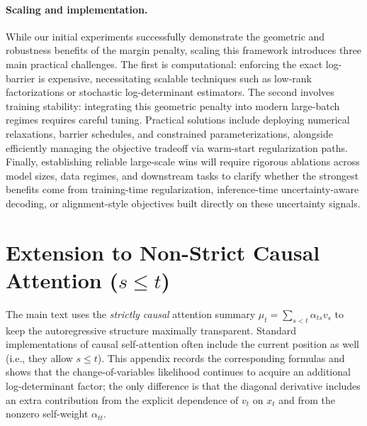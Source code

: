 \documentclass[11pt]{article}
\begin{document}
\paragraph{Scaling and implementation.}
While our initial experiments successfully demonstrate the geometric and robustness benefits of the margin penalty, scaling this framework introduces three main practical challenges.
The first is computational: enforcing the exact log-barrier is expensive, necessitating scalable techniques such as low-rank factorizations or stochastic log-determinant estimators.
The second involves training stability: integrating this geometric penalty into modern large-batch regimes requires careful tuning. Practical solutions include deploying numerical relaxations, barrier schedules, and constrained parameterizations, alongside efficiently managing the objective tradeoff via warm-start regularization paths.
Finally, establishing reliable large-scale wins will require rigorous ablations across model sizes, data regimes, and downstream tasks to clarify whether the strongest benefits come from training-time regularization, inference-time uncertainty-aware decoding, or alignment-style objectives built directly on these uncertainty signals.


\setlength{\bibsep}{2pt}
 


\appendix

\section{Extension to Non-Strict Causal Attention (\texorpdfstring{$s \le t$}{s <= t})}
\label{app:self_in_context}

The main text uses the \emph{strictly causal} attention summary $\mu_t=\sum_{s<t}\alpha_{ts}v_s$ to keep the autoregressive structure maximally transparent. Standard implementations of causal self-attention often include the current position as well (i.e., they allow $s\le t$). This appendix records the corresponding formulas and shows that the change-of-variables likelihood continues to acquire an additional log-determinant factor; the only difference is that the diagonal derivative includes an extra contribution from the explicit dependence of $v_t$ on $x_t$ and from the nonzero self-weight $\alpha_{tt}$.
\end{document}
